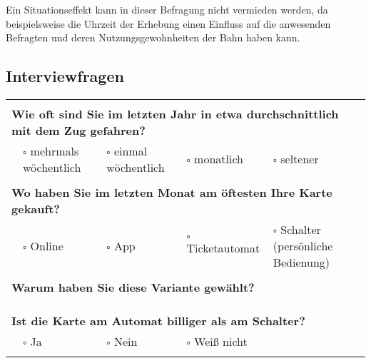 \documentclass[]{article}
\begin{document}
Ein Situationseffekt kann in dieser Befragung nicht vermieden werden, da beispielsweise die Uhrzeit der Erhebung einen Einfluss auf die anwesenden Befragten und deren Nutzungsgewohnheiten der Bahn haben kann.


\newpage
{}
\begin{landscape}

\section{Interviewfragen}
\label{sec:interviewfragen}

\begin{table}[h!]
	\large
	\begin{tabular}{|llllll|}
		\hline
		& & & & & \\
		\multicolumn{6}{|l|}{\textbf{Wie oft sind Sie im letzten Jahr in etwa durchschnittlich mit dem Zug gefahren?}}                      \\ \hline
		& $\square$ mehrmals wöchentlich & $\square$ einmal wöchentlich & $\square$ monatlich & $\square$ seltener &                        \\ \hline
		& & & & & \\
		\multicolumn{6}{|l|}{\textbf{Wo haben Sie im letzten Monat am öftesten Ihre Karte gekauft?}}                                        \\ \hline
		& $\square$ Online & $\square$ App & $\square$ Ticketautomat & \multicolumn{2}{l|}{$\square$ Schalter (persönliche Bedienung)}      \\ \hline
		& & & & & \\
		\multicolumn{6}{|l|}{\textbf{Warum haben Sie diese Variante gewählt?}}                                                              \\ \hline
		\multicolumn{6}{|l|}{}                                                                                                              \\
		& & & & & \\ \hline
		& & & & & \\
		\multicolumn{6}{|l|}{\textbf{Ist die Karte am Automat billiger als am Schalter?}}                                                   \\ \hline
		& $\square$ Ja & $\square$ Nein & $\square$ Weiß nicht &  &                                                                         \\ \hline
		& & & & & \\

\end{tabular}
\end{table}
\end{landscape}
\end{document}
